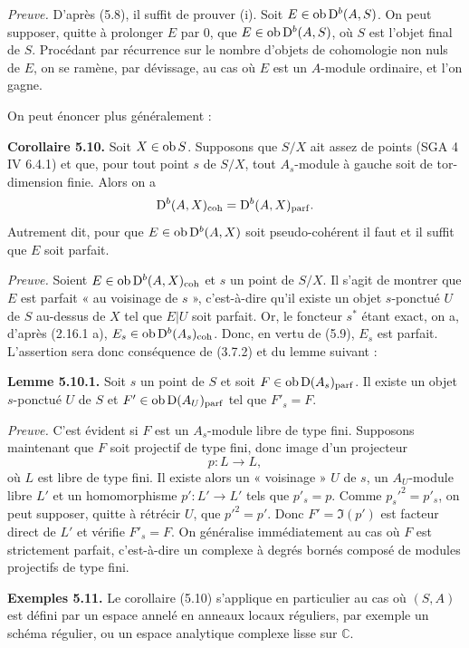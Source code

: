 \documentclass[11pt]{article}
\begin{document}
\emph{Preuve.} D'après (5.8), il suffit de prouver (i). Soit \(E\in\operatorname{ob}\mathrm D^b(A,S)\). On peut supposer, quitte à prolonger \(E\) par \(0\), que \(E\in\operatorname{ob}\mathrm D^b(A,S)\), où \(S\) est l'objet final de \(S\). Procédant par récurrence sur le nombre d'objets de cohomologie non nuls de \(E\), on se ramène, par dévissage, au cas où \(E\) est un \(A\)-module ordinaire, et l'on gagne.

On peut énoncer plus généralement :

\textbf{Corollaire 5.10.} Soit \(X\in\operatorname{ob} S\). Supposons que \(S/X\) ait assez de points (SGA 4 IV 6.4.1) et que, pour tout point \(s\) de \(S/X\), tout \(A_s\)-module à gauche soit de tor-dimension finie. Alors on a
\[
  \mathrm D^b(A,X)_{\mathrm{coh}}=\mathrm D^b(A,X)_{\mathrm{parf}}.
\]
Autrement dit, pour que \(E\in\operatorname{ob}\mathrm D^b(A,X)\) soit pseudo-cohérent il faut et il suffit que \(E\) soit parfait.

\emph{Preuve.} Soient \(E\in\operatorname{ob}\mathrm D^b(A,X)_{\mathrm{coh}}\) et \(s\) un point de \(S/X\). Il s'agit de montrer que \(E\) est parfait « au voisinage de \(s\) », c'est-à-dire qu'il existe un objet \(s\)-ponctué \(U\) de \(S\) au-dessus de \(X\) tel que \(E|U\) soit parfait. Or, le foncteur \(s^*\) étant exact, on a, d'après (2.16.1 a), \(E_s\in\operatorname{ob}\mathrm D^b(A_s)_{\mathrm{coh}}\). Donc, en vertu de (5.9), \(E_s\) est parfait. L'assertion sera donc conséquence de (3.7.2) et du lemme suivant :

\textbf{Lemme 5.10.1.} Soit \(s\) un point de \(S\) et soit \(F\in\operatorname{ob}\mathrm D(A_s)_{\mathrm{parf}}\). Il existe un objet \(s\)-ponctué \(U\) de \(S\) et \(F'\in\operatorname{ob}\mathrm D(A_U)_{\mathrm{parf}}\) tel que \(F'_s=F\).

\emph{Preuve.} C'est évident si \(F\) est un \(A_s\)-module libre de type fini. Supposons maintenant que \(F\) soit projectif de type fini, donc image d'un projecteur
\[
  p:L\longrightarrow L,
\]
où \(L\) est libre de type fini. Il existe alors un « voisinage » \(U\) de \(s\), un \(A_U\)-module libre \(L'\) et un homomorphisme \(p':L'\to L'\) tels que \(p'_s=p\). Comme \(p_s'^2=p'_s\), on peut supposer, quitte à rétrécir \(U\), que \(p'^2=p'\). Donc \(F'=\Im(p')\) est facteur direct de \(L'\) et vérifie \(F'_s=F\). On généralise immédiatement au cas où \(F\) est strictement parfait, c'est-à-dire un complexe à degrés bornés composé de modules projectifs de type fini.

\textbf{Exemples 5.11.} Le corollaire (5.10) s'applique en particulier au cas où \((S,A)\) est défini par un espace annelé en anneaux locaux réguliers, par exemple un schéma régulier, ou un espace analytique complexe lisse sur \(\mathbb C\).
\end{document}
